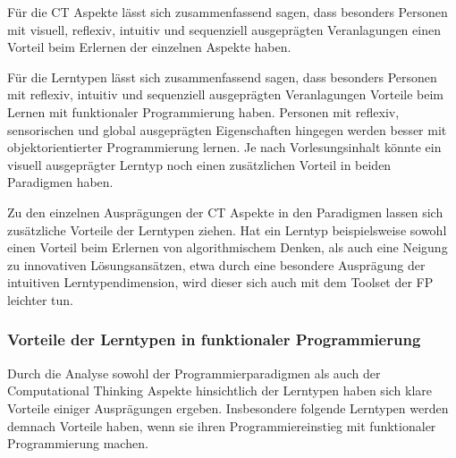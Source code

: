 Für die CT Aspekte lässt sich zusammenfassend sagen, dass besonders Personen mit visuell, reflexiv, intuitiv und sequenziell ausgeprägten Veranlagungen einen Vorteil beim Erlernen der einzelnen Aspekte haben.

Für die Lerntypen lässt sich zusammenfassend sagen, dass besonders Personen mit reflexiv, intuitiv und sequenziell ausgeprägten Veranlagungen Vorteile beim Lernen mit funktionaler Programmierung haben.
Personen mit reflexiv, sensorischen und global ausgeprägten Eigenschaften hingegen werden besser mit objektorientierter Programmierung lernen.
Je nach Vorlesungsinhalt könnte ein visuell ausgeprägter Lerntyp noch einen zusätzlichen Vorteil in beiden Paradigmen haben.

Zu den einzelnen Ausprägungen der CT Aspekte in den Paradigmen lassen sich zusätzliche Vorteile der Lerntypen ziehen.
Hat ein Lerntyp beispielsweise sowohl einen Vorteil beim Erlernen von algorithmischem Denken, als auch eine Neigung zu innovativen Lösungsansätzen, etwa durch eine besondere Ausprägung der intuitiven Lerntypendimension, wird dieser sich auch mit dem Toolset der FP leichter tun.

\subsubsection{Vorteile der Lerntypen in funktionaler Programmierung}
Durch die Analyse sowohl der Programmierparadigmen als auch der Computational Thinking Aspekte hinsichtlich der Lerntypen haben sich klare Vorteile einiger Ausprägungen ergeben.
Insbesondere folgende Lerntypen werden demnach Vorteile haben, wenn sie ihren Programmiereinstieg mit funktionaler Programmierung machen.

